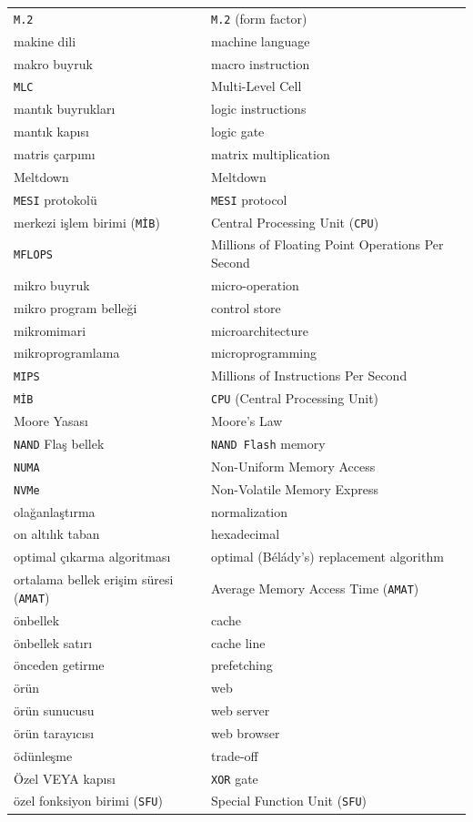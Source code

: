 {\begin{longtable}{@{}p{7.6cm}p{7.6cm}@{}}
\texttt{M.2} & \texttt{M.2} (form factor) \\
makine dili & machine language \\
makro buyruk & macro instruction \\
\texttt{MLC} & Multi-Level Cell \\
mantık buyrukları & logic instructions \\
mantık kapısı & logic gate \\
matris çarpımı & matrix multiplication \\
Meltdown & Meltdown \\
\texttt{MESI} protokolü & \texttt{MESI} protocol \\
merkezi işlem birimi (\texttt{MİB}) & Central Processing Unit (\texttt{CPU}) \\
\texttt{MFLOPS} & Millions of Floating Point Operations Per Second \\
mikro buyruk & micro-operation \\
mikro program belleği & control store \\
mikromimari & microarchitecture \\
mikroprogramlama & microprogramming \\
\texttt{MIPS} & Millions of Instructions Per Second \\
\texttt{MİB} & \texttt{CPU} (Central Processing Unit) \\
Moore Yasası & Moore's Law \\

\texttt{NAND} Flaş bellek & \texttt{NAND Flash} memory \\
\texttt{NUMA} & Non-Uniform Memory Access \\
\texttt{NVMe} & Non-Volatile Memory Express \\

olağanlaştırma & normalization \\
on altılık taban & hexadecimal \\
optimal çıkarma algoritması & optimal (Bélády's) replacement algorithm \\
ortalama bellek erişim süresi (\texttt{AMAT}) & Average Memory Access Time (\texttt{AMAT}) \\

önbellek & cache \\
önbellek satırı & cache line \\
önceden getirme & prefetching \\
örün & web \\
örün sunucusu & web server \\
örün tarayıcısı & web browser \\
ödünleşme & trade-off \\
Özel VEYA kapısı & \texttt{XOR} gate \\
özel fonksiyon birimi (\texttt{SFU}) & Special Function Unit (\texttt{SFU}) \\


\end{longtable}}
